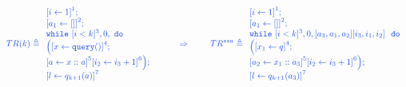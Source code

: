\documentclass[a4paper,11pt]{article}
\begin{document}
\begin{example}
\[
\jl{
TR(k) \triangleq
{
\begin{array}{l}
    \left[i \leftarrow 1 \right]^1 ; \\
    \left[a_1 \leftarrow [] \right]^2; \\
   \ewhile ~ [i < k]^{3}, 0,     ~ \edo ~ \\
    \Big(
     \clabel{x \leftarrow \query() }^4 ; \\
    \clabel{a \leftarrow x :: a }^5  
        \left[i_2 \leftarrow i_3 + 1 \right]^6 
   \Big);\\
    \clabel{l \leftarrow q_{k + 1}(a)}^{7}\\
\end{array}
}
%
~~~~~~~~ \Rightarrow ~~~~~~~
%
TR^{ssa} \triangleq
\begin{array}{l}
    \left[i \leftarrow 1 \right]^1 ; \\
    \left[a_1 \leftarrow [] \right]^2; \\
   \ewhile ~ [i < k]^{3}, 0, 
   [ a_3,a_1,a_2 ] [ i_3,i_1,i_2 ] ~ 
    ~ \edo ~ \\
   \Big( 
     \left[x_1 \leftarrow q \right]^4; \\
    \left[a_2 \leftarrow x_1 :: a_3 \right]^5 
    \left[i_2 \leftarrow i_3 + 1 \right]^6 
    \Big);\\
    \clabel{l \leftarrow q_{k + 1}(a_3)}^{7}\\
\end{array}
}
\]

\end{example}
\end{document}
